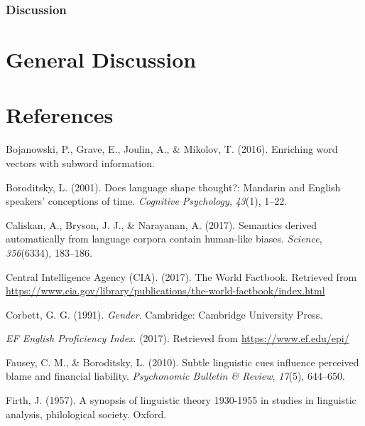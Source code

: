 \documentclass[man]{apa6}
\theoremstyle{definition}
\theoremstyle{definition}
\theoremstyle{definition}
\theoremstyle{remark}
\begin{document}
\subsubsection{Discussion}\label{discussion-2}

\section{General Discussion}\label{general-discussion}

\newpage

\section{References}\label{references}

\begingroup
\setlength{\parindent}{-0.5in} \setlength{\leftskip}{0.5in}

\hypertarget{refs}{}
\hypertarget{ref-bojanowski2016enriching}{}
Bojanowski, P., Grave, E., Joulin, A., \& Mikolov, T. (2016). Enriching
word vectors with subword information.

\hypertarget{ref-boroditsky2001does}{}
Boroditsky, L. (2001). Does language shape thought?: Mandarin and
English speakers' conceptions of time. \emph{Cognitive Psychology},
\emph{43}(1), 1--22.

\hypertarget{ref-caliskan2017semantics}{}
Caliskan, A., Bryson, J. J., \& Narayanan, A. (2017). Semantics derived
automatically from language corpora contain human-like biases.
\emph{Science}, \emph{356}(6334), 183--186.

\hypertarget{ref-ciafactbook}{}
Central Intelligence Agency (CIA). (2017). The World Factbook. Retrieved
from
\url{https://www.cia.gov/library/publications/the-world-factbook/index.html}

\hypertarget{ref-corbett1991}{}
Corbett, G. G. (1991). \emph{Gender}. Cambridge: Cambridge University
Press.

\hypertarget{ref-epi}{}
\emph{EF English Proficiency Index}. (2017). Retrieved from
\url{https://www.ef.edu/epi/}

\hypertarget{ref-fausey2010subtle}{}
Fausey, C. M., \& Boroditsky, L. (2010). Subtle linguistic cues
influence perceived blame and financial liability. \emph{Psychonomic
Bulletin \& Review}, \emph{17}(5), 644--650.

\hypertarget{ref-firth1957synopsis}{}
Firth, J. (1957). A synopsis of linguistic theory 1930-1955 in studies
in linguistic analysis, philological society. Oxford.
\end{document}
